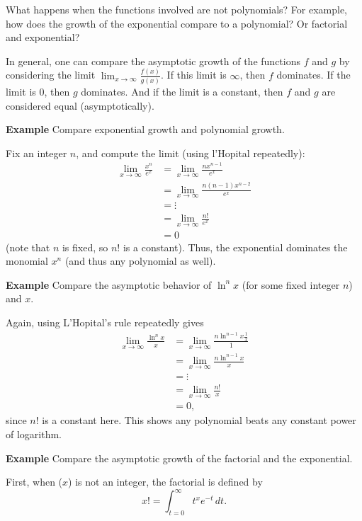 \documentclass[a4paper]{book}
\begin{document}
\begin{sloppypar}
What happens when the functions involved are not polynomials? For example, how does the growth of the exponential compare to a polynomial? Or factorial and exponential?

In general, one can compare the asymptotic growth of the functions $f$ and $g$ by considering the limit $\lim_{x \rightarrow \infty} \frac{f(x)}{g(x)}$. If this limit is $\infty$, then $f$ dominates. If the limit is 0, then $g$ dominates. And if the limit is a constant, then $f$ and $g$ are considered equal (asymptotically).

\textbf{Example} Compare exponential growth and polynomial growth. 
\begin{examplebox}
Fix an integer $n$, and compute the limit (using l'Hopital repeatedly):
\begin{align*}
\lim_{x \rightarrow \infty} \frac{x^n}{e^x} &= \lim_{x \rightarrow \infty} \frac{nx^{n-1}}{e^x} \\
&= \lim_{x \rightarrow \infty} \frac{n(n-1)x^{n-2}}{e^x} \\
&= \vdots \\
&= \lim_{x \rightarrow \infty} \frac{n!}{e^x} \\
&= 0
\end{align*}
(note that $n$ is fixed, so $n!$ is a constant). Thus, the exponential dominates the monomial $x^n$ (and thus any polynomial as well).
\end{examplebox}

\textbf{Example} Compare the asymptotic behavior of $\ln^n x$ (for some fixed integer $n$) and $x$.
\begin{examplebox}
Again, using L'Hopital's rule repeatedly gives
\begin{align*}
\lim_{x \rightarrow \infty} \frac{\ln^n x}{x} &= \lim_{x \rightarrow \infty} \frac{n \ln^{n-1} x \frac{1}{x}}{1} \\
&= \lim_{x \rightarrow \infty} \frac{n \ln^{n-1} x}{x} \\
&= \vdots \\
&= \lim_{x \rightarrow \infty} \frac{n!}{x} \\
&= 0,
\end{align*}
since $n!$ is a constant here. This shows any polynomial beats any constant power of logarithm.
\end{examplebox}

\textbf{Example} Compare the asymptotic growth of the factorial and the exponential.
\begin{examplebox}
First, when ($x$) is not an integer, the factorial is defined by \[ x! = \int_{t=0}^\infty t^x e^{-t} \, dt. \]


\end{examplebox}
\end{sloppypar}
\end{document}
